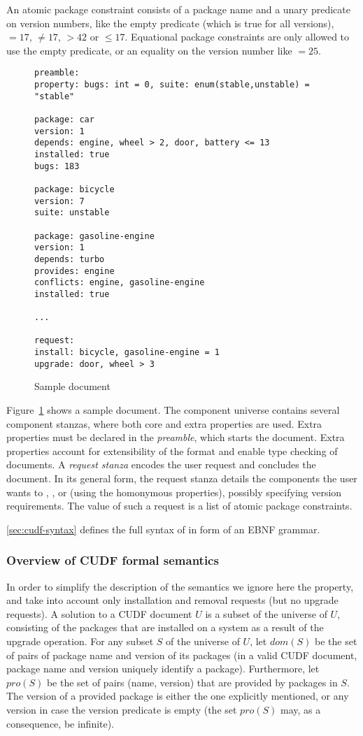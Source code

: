 An atomic package constraint consists of a package name and a unary
predicate on version numbers, like the empty predicate (which is true
for all versions), $=17$, $\neq 17$, $> 42$ or $\leq 17$. Equational
package constraints are only allowed to use the empty predicate, or an
equality on the version number like $=25$.

\begin{figure}[t]
  \begin{lstlisting}[style=cudf]
preamble:
property: bugs: int = 0, suite: enum(stable,unstable) = "stable"

package: car
version: 1
depends: engine, wheel > 2, door, battery <= 13
installed: true
bugs: 183

package: bicycle
version: 7
suite: unstable

package: gasoline-engine
version: 1
depends: turbo
provides: engine
conflicts: engine, gasoline-engine
installed: true

...

request:
install: bicycle, gasoline-engine = 1
upgrade: door, wheel > 3
\end{lstlisting}
  \caption{Sample \CUDF{} document}
  \label{fig:cudf-example}
\end{figure}

Figure~\ref{fig:cudf-example} shows a sample \CUDF{} document. The
component universe contains several component stanzas, where both core
and extra properties are used. Extra properties must be declared in
the \emph{preamble}, which starts the document. Extra properties
account for extensibility of the format and enable type checking of
\CUDF{} documents. A \emph{request stanza} encodes the user request
and concludes the document. In its general form, the request stanza
details the components the user wants to
, , or  (using the homonymous
properties), possibly specifying version requirements. The value of such
a request is a list of atomic package constraints.

\ref{sec:cudf-syntax} defines the full syntax of \CUDF{} in form of an
EBNF grammar.

\subsubsection{Overview of CUDF formal semantics}
\label{sec:cudf-semantics-overview}
In order to simplify the description of the semantics we ignore here
the  property, and take into account only installation and
removal requests (but no upgrade requests). A solution to a CUDF
document $U$ is a subset of the universe of $U$, consisting of the
packages that are installed on a system as a result of the upgrade
operation.  For any subset $S$ of the universe of $U$, let $dom(S)$ be
the set of pairs of package name and version of its packages (in a
valid CUDF document, package name and version uniquely identify a
package). Furthermore, let $pro(S)$ be the set of pairs (name,
version) that are provided by packages in $S$. The version of a
provided package is either the one explicitly mentioned, or any
version in case the version predicate is empty (the set $pro(S)$ may,
as a consequence, be infinite).

